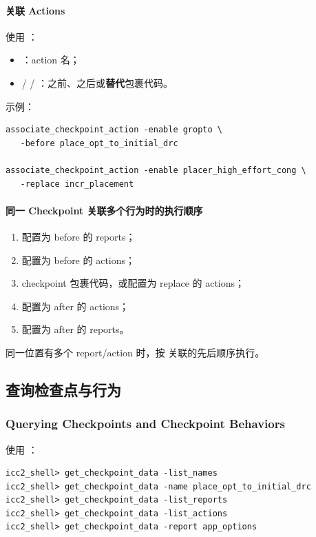 \paragraph{关联 Actions}
使用 ：
\begin{itemize}
  \item {}：action 名；
  \item {} /  / ：之前、之后或\textbf{替代}包裹代码。
\end{itemize}

示例：
\begin{lstlisting}
associate_checkpoint_action -enable gropto \
   -before place_opt_to_initial_drc

associate_checkpoint_action -enable placer_high_effort_cong \
   -replace incr_placement
\end{lstlisting}

\paragraph{同一 Checkpoint 关联多个行为时的执行顺序}
\begin{enumerate}
  \item 配置为 before 的 reports；
  \item 配置为 before 的 actions；
  \item checkpoint 包裹代码，或配置为 replace 的 actions；
  \item 配置为 after 的 actions；
  \item 配置为 after 的 reports。
\end{enumerate}
同一位置有多个 report/action 时，按  关联的先后顺序执行。

\subsection{查询检查点与行为}
\subsubsection*{Querying Checkpoints and Checkpoint Behaviors}

使用 ：
\begin{lstlisting}
icc2_shell> get_checkpoint_data -list_names
icc2_shell> get_checkpoint_data -name place_opt_to_initial_drc
icc2_shell> get_checkpoint_data -list_reports
icc2_shell> get_checkpoint_data -list_actions
icc2_shell> get_checkpoint_data -report app_options
\end{lstlisting}

